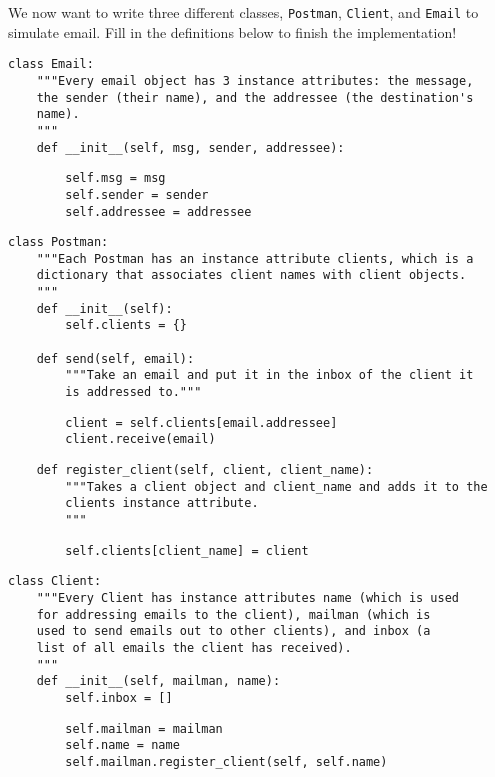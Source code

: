 \question

We now want to write three different classes, \texttt{Postman}, \texttt{Client},
and \texttt{Email} to simulate email. Fill in the definitions below to finish
the implementation!

\begin{lstlisting}
class Email:
    """Every email object has 3 instance attributes: the message,
    the sender (their name), and the addressee (the destination's
    name).
    """
    def __init__(self, msg, sender, addressee):
\end{lstlisting}
\begin{solution}[1in]
\begin{lstlisting}
        self.msg = msg
        self.sender = sender
        self.addressee = addressee
\end{lstlisting}
\end{solution}

\pagebreak

\begin{lstlisting}
class Postman:
    """Each Postman has an instance attribute clients, which is a
    dictionary that associates client names with client objects.
    """
    def __init__(self):
        self.clients = {}

    def send(self, email):
        """Take an email and put it in the inbox of the client it
        is addressed to."""
\end{lstlisting}
\begin{solution}[1in]
\begin{lstlisting}
        client = self.clients[email.addressee]
        client.receive(email)
\end{lstlisting}
\end{solution}

\begin{lstlisting}
    def register_client(self, client, client_name):
        """Takes a client object and client_name and adds it to the
        clients instance attribute.
        """
\end{lstlisting}
\begin{solution}[1in]
\begin{lstlisting}
        self.clients[client_name] = client
\end{lstlisting}
\end{solution}

\pagebreak

\begin{lstlisting}
class Client:
    """Every Client has instance attributes name (which is used
    for addressing emails to the client), mailman (which is
    used to send emails out to other clients), and inbox (a
    list of all emails the client has received).
    """
    def __init__(self, mailman, name):
        self.inbox = []
\end{lstlisting}
\begin{solution}[1in]
\begin{lstlisting}
        self.mailman = mailman
        self.name = name
        self.mailman.register_client(self, self.name)
\end{lstlisting}
\end{solution}

